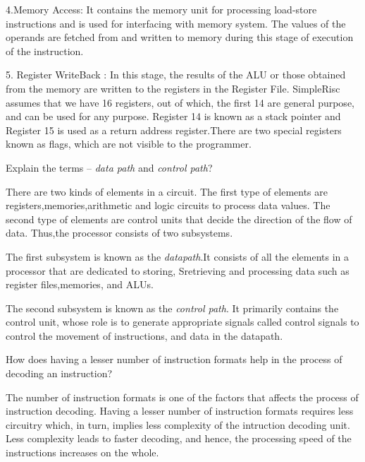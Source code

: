 \begin{ExerciseList}
4.\hspace{4mm}Memory Access:
It contains the memory unit for processing load-store instructions and is used for interfacing with memory system. The values of the operands are fetched from and written to memory during this stage of execution of the instruction.\newline

5.\hspace{4mm} Register WriteBack :
In this stage, the results of the ALU or those obtained from the memory are written to the registers in the Register File. SimpleRisc assumes that we have 16 registers, out of which, the first 14 are general purpose, and can be used for any purpose. Register 14 is known as a stack pointer and Register 15 is used as a return address register.There are two special registers known as flags, which are not visible to the programmer.

\Exercise
Explain the terms -- {\em data path} and {\em control path}?

\Answer
There are two kinds of elements in a circuit. The first type of elements are registers,memories,arithmetic and logic circuits to process data values. The second type of elements are control units that decide the direction of the flow of data.\newline
Thus,the processor consists of two subsystems.\newline

The first subsystem is known as the \textit{datapath}.It consists of all the elements in a processor that are dedicated to storing, Sretrieving and processing data such as register files,memories, and ALUs.\newline

The second subsystem is known as the \textit{control path}. It primarily contains the control unit, whose role is to generate appropriate signals called control signals to control the movement of instructions, and data in the datapath.

\Exercise How does having a lesser number of instruction formats help in the process
of decoding an instruction?

\Answer
The number of instruction formats is one of the factors that affects the process of instruction decoding. Having a lesser number of instruction formats requires less circuitry which, in turn, implies less complexity of the intruction decoding unit. Less complexity leads to faster decoding, and hence, the processing speed of the instructions increases on the whole. 


\end{ExerciseList}
